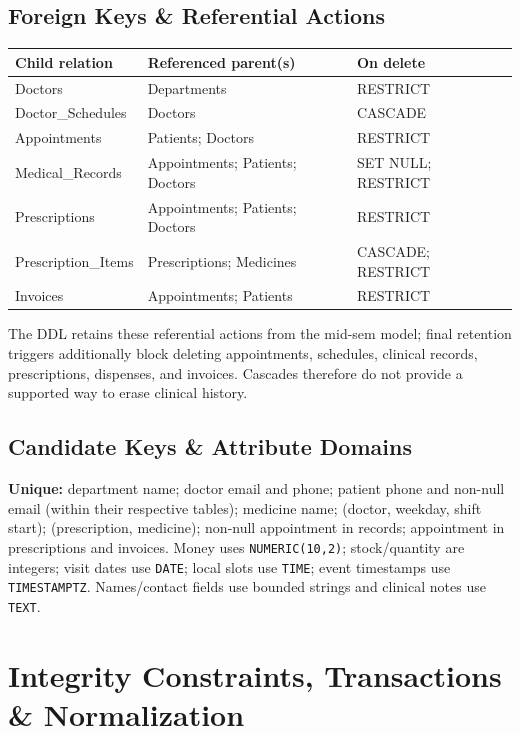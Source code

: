 \documentclass[10pt,a4paper]{article}
\begin{document}
\subsection{Foreign Keys \& Referential Actions}
{\small
\begin{tabularx}{\linewidth}{@{}p{3.0cm}X p{2.1cm}@{}}
\toprule \textbf{Child relation} & \textbf{Referenced parent(s)} & \textbf{On delete}\\\midrule
Doctors & Departments & RESTRICT\\
Doctor\_Schedules & Doctors & CASCADE\\
Appointments & Patients; Doctors & RESTRICT\\
Medical\_Records & Appointments; Patients; Doctors & SET NULL; RESTRICT\\
Prescriptions & Appointments; Patients; Doctors & RESTRICT\\
Prescription\_Items & Prescriptions; Medicines & CASCADE; RESTRICT\\
Invoices & Appointments; Patients & RESTRICT\\\bottomrule
\end{tabularx}}
{\small The DDL retains these referential actions from the mid-sem model; final retention triggers additionally block deleting appointments, schedules, clinical records, prescriptions, dispenses, and invoices. Cascades therefore do not provide a supported way to erase clinical history.}

\subsection{Candidate Keys \& Attribute Domains}
{\small \textbf{Unique:} department name; doctor email and phone; patient phone and non-null email (within their respective tables); medicine name; (doctor, weekday, shift start); (prescription, medicine); non-null appointment in records; appointment in prescriptions and invoices. Money uses \texttt{NUMERIC(10,2)}; stock/quantity are integers; visit dates use \texttt{DATE}; local slots use \texttt{TIME}; event timestamps use \texttt{TIMESTAMPTZ}. Names/contact fields use bounded strings and clinical notes use \texttt{TEXT}.}

\newpage
\section{Integrity Constraints, Transactions \& Normalization}
\end{document}
